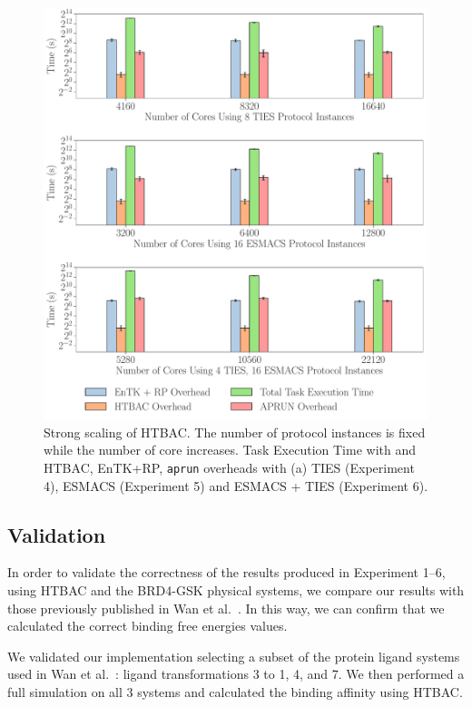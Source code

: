 \begin{figure}
  \centering
   \includegraphics[width=\columnwidth]{figures/ss_all_base2.pdf}
   \caption{Strong scaling of HTBAC. The number of protocol instances is
    fixed while the number of core increases. Task Execution Time with and
    HTBAC, EnTK+RP, \texttt{aprun} overheads with (a) TIES (Experiment 4),
    ESMACS (Experiment 5) and ESMACS + TIES (Experiment 6).}\label{fig:ss}
\up{}
\up{}
\up{}
\end{figure}

\subsection{Validation}

In order to validate the correctness of the results produced in Experiment
1--6, using HTBAC and the BRD4-GSK physical systems, we compare our results
with those previously published in Wan et al.~\cite{Wan2017brd4}. In this
way, we can confirm that we calculated the correct binding free energies
values.

We validated our implementation selecting a subset of the protein ligand
systems used in Wan et al.~\cite{Wan2017brd4}: ligand transformations 3 to 1,
4, and 7. We then performed a full simulation on all 3 systems and calculated
the binding affinity using HTBAC.

